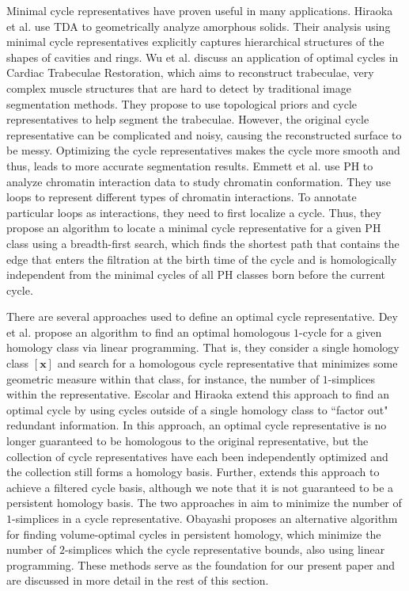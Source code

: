 \documentclass[11pt,onecolumn]{article}
\newcommand{\optimalrep}{\mathbf{x}}
\theoremstyle{plain}
\theoremstyle{definition}
\begin{document}
Minimal cycle representatives have proven  useful in many applications. Hiraoka et al. \cite{Hiraoka7035} use TDA to geometrically analyze amorphous solids. Their analysis using minimal cycle representatives explicitly captures hierarchical structures of the shapes of cavities and rings. Wu et al. \cite{wu} discuss an application of optimal cycles in Cardiac Trabeculae Restoration, which aims to reconstruct trabeculae, very complex muscle structures that are hard to detect by traditional image segmentation methods. They propose to use topological priors and cycle representatives to help segment the trabeculae. However, the original cycle representative can be complicated and noisy, causing the reconstructed surface to be messy. Optimizing the cycle representatives makes the cycle more smooth and thus, leads to more accurate segmentation results. Emmett et al. \cite{emmett2015multiscale} use PH to analyze chromatin interaction data to study chromatin conformation. They use loops to represent different types of chromatin interactions. To annotate particular loops as interactions, they need to first localize a cycle. Thus, they propose an algorithm to locate a minimal cycle representative for a given PH class using a breadth-first search, which finds the shortest path that contains the edge that enters the filtration at the birth time of the cycle and is homologically independent from the minimal cycles of all PH classes born before the current cycle. 

 
There are several approaches used to define an optimal cycle representative. Dey et al. \cite{dey2011optimal} propose an algorithm to find an optimal homologous $1$-cycle for a given homology class via linear programming. That is, they consider a single homology class $[\optimalrep]$ and search for a homologous cycle representative that minimizes some geometric measure within that class, for instance, the number of $1$-simplices within the representative. Escolar and Hiraoka \cite{Escolar2016} extend this approach to find an optimal cycle by using cycles outside of a single homology class to ``factor out" redundant information. In this approach, an optimal cycle representative is no longer guaranteed to be homologous to the original representative, but the collection of cycle representatives have each been independently optimized and the collection still forms a homology basis. Further, \cite{Escolar2016} extends this approach to achieve a filtered cycle basis, although we note that it is not guaranteed to be a persistent homology basis. The two approaches in \cite{dey2011optimal,Escolar2016} aim to minimize the number of $1$-simplices in a cycle representative. Obayashi \cite{Obayashi2018} proposes an alternative algorithm for finding volume-optimal cycles in persistent homology, which minimize the number of $2$-simplices which the cycle representative bounds, also using linear programming. These methods serve as the foundation for our present paper and are discussed in more detail in the rest of this section.  
\end{document}
